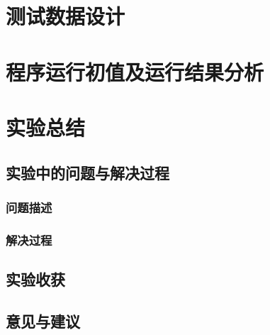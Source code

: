 \documentclass[forprint]{plainAssign}
\begin{document}
 \section{测试数据设计}
 
 \section{程序运行初值及运行结果分析}
 
 \section{实验总结}
 
 \subsection{实验中的问题与解决过程}
 
 \subsubsection{问题描述}
 
 \subsubsection{解决过程}
 
 \subsection{实验收获}
 
 \subsection{意见与建议}
 






%
%
\end{document}
